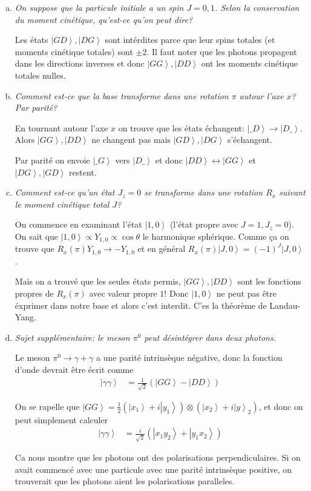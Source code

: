 \documentclass[10pt]{report}
\newcommand{\ket}[1]{\left|#1\right>}
\begin{document}
\begin{enumerate}[a)]
    \item \emph{On suppose que la particule initiale a un spin $J=0,1$. Selon la conservation du moment cin\'etique, qu'est-ce qu'on peut dire?}

        Les \'etats $\ket{GD}, \ket{DG}$ sont int\'erdites parce que leur spins totales (et moments cin\'etique totales) sont $\pm 2$. Il faut noter que les photons propagent dans les directions inverses et donc $\ket{GG}, \ket{DD}$ ont les moments cin\'etique totales nulles. 
    \item \emph{Comment est-ce que la base transforme dans une rotation $\pi$ autour l'axe $x$? Par parit\'e?}

        En tournant autour l'axe $x$ on trouve que les \'etats \'echangent: $\ket{\_D} \to \ket{D\_}$. Alors $\ket{GG}, \ket{DD}$ ne changent pas mais $\ket{GD}, \ket{DG}$ s'\'echangent.

        Par parit\'e on envoie $\ket{\_G}$ vers $\ket{D\_}$ et donc $\ket{DD} \leftrightarrow \ket{GG}$ et $\ket{DG}, \ket{GD}$ restent.

    \item \emph{Comment est-ce qu'un \'etat $J_z = 0$ se transforme dans une rotation $R_x$ suivant le moment cin\'etique total $J$?}

        On commence en examinant l'\'etat $\ket{1,0}$ (l'\'etat propre avec $J=1, J_z = 0$). On sait que $\ket{1,0} \propto Y_{1,0}\propto\cos\theta$ le harmonique sph\'erique. Comme \c{c}a on trouve que $R_x(\pi) Y_{1,0} \to -Y_{1,0}$ et en g\'en\'eral $R_x(\pi)\ket{J,0} = (-1)^J\ket{J,0}$. 

        Mais on a trouv\'e que les seules \'etats permis, $\ket{GG}, \ket{DD}$ sont les fonctions propres de $R_x(\pi)$ avec valeur propre $1$! Donc $\ket{1,0}$ ne peut pas \^etre \'exprimer dans notre base et alors c'est interdit. C'es la th\'eor\`eme de Landau-Yang.

    \item \emph{Sujet suppl\'ementaire: le meson $\pi^0$ peut d\'esint\'egrer dans deux photons.}

        Le meson $\pi^0 \to \gamma + \gamma$ a une parit\'e intrins\`eque n\'egative, donc la fonction d'onde devrait \^etre \'ecrit comme
        \begin{align}
            \ket{\gamma\gamma} &= \frac{1}{\sqrt{2}}\left( \ket{GG} - \ket{DD} \right)
        \end{align}

        On se rapelle que $\ket{GG} = \frac{1}{2}\left( \ket{x_1} + i\ket{y_1} \right)\otimes\left( \ket{x_2} + i\ket{y}_2 \right)$, et donc on peut simplement calculer
        \begin{align}
            \ket{\gamma\gamma} &= \frac{i}{\sqrt{2}}\left( \ket{x_1y_2} + \ket{y_1x_2} \right)
        \end{align}

        Ca nous montre que les photons ont des polarisations perpendiculaires. Si on avait commenc\'e avec une particule avec une parit\'e intrins\`eque positive, on trouverait que les photons aient les polarisations paralleles. 
\end{enumerate}
\end{document}
